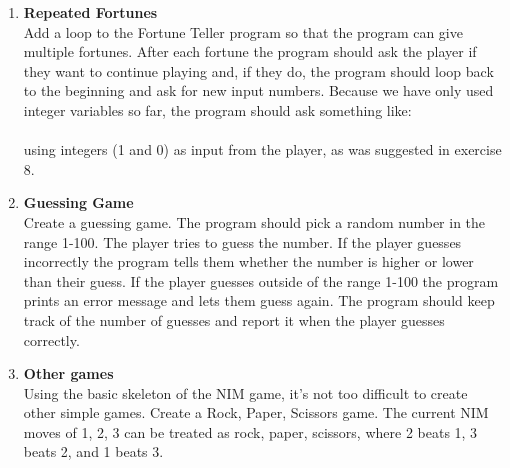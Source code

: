 \begin{enumerate}[{\bf 1.}]
\item {\bf Repeated Fortunes} \\ Add a loop to the Fortune Teller program so that the program can give multiple fortunes.  After each fortune the program should ask the player if they want to continue playing and, if they do, the program should loop back to the beginning and ask for new input numbers.  Because we have only used integer variables so far, the program should ask something like:\\
\\
using integers (1 and 0) as input from the player, as was suggested in exercise 8.  

\item {\bf Guessing Game}\\ Create a guessing game.  The program should pick a random number in the range 1-100.  The player tries to guess the number.  If the player guesses incorrectly the program tells them whether the number is higher or lower than their guess.  If the player guesses outside of the range 1-100 the program prints an error message and lets them guess again.   The program 
should keep track of the number of guesses and report it when the player guesses correctly.

\item {\bf Other games}\\ Using the basic skeleton of the NIM game, it's not too difficult to create other simple games.  Create a Rock, Paper, Scissors game.   The current NIM moves of 1, 2, 3 can be treated as rock, paper, scissors, where 2 beats 1, 3 beats 2, and 1 beats 3.
\end{enumerate}


